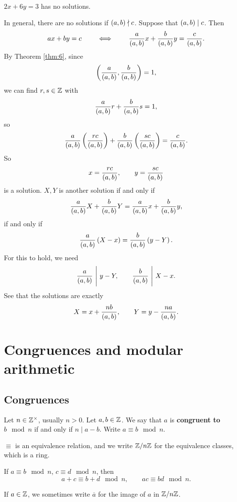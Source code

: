 \begin{example*}
$ 2x + 6y = 3 $ has no solutions.
\end{example*}

In general, there are no solutions if $ \left( a, b \right) \nmid c $. Suppose that $ \left( a, b \right) \mid c $. Then
$$ ax + by = c \qquad \iff \qquad \dfrac{a}{\left( a, b \right)}x + \dfrac{b}{\left( a, b \right)}y = \dfrac{c}{\left( a, b \right)}. $$
By Theorem \ref{thm:6}, since
$$ \left( \dfrac{a}{\left( a, b \right)}, \dfrac{b}{\left( a, b \right)} \right) = 1, $$
we can find $ r, s \in \mathbb{Z} $ with
$$ \dfrac{a}{\left( a, b \right)}r + \dfrac{b}{\left( a, b \right)}s = 1, $$
so
$$ \dfrac{a}{\left( a, b \right)}\left( \dfrac{rc}{\left( a, b \right)} \right) + \dfrac{b}{\left( a, b \right)}\left( \dfrac{sc}{\left( a, b \right)} \right) = \dfrac{c}{\left( a, b \right)}. $$
So
$$ x = \dfrac{rc}{\left( a, b \right)}, \qquad y = \dfrac{sc}{\left( a, b \right)} $$
is a solution.
$ X, Y $ is another solution if and only if
$$ \dfrac{a}{\left( a, b \right)}X + \dfrac{b}{\left( a, b \right)}Y = \dfrac{a}{\left( a, b \right)}x + \dfrac{b}{\left( a, b \right)}y, $$
if and only if
$$ \dfrac{a}{\left( a, b \right)}\left( X - x \right) = \dfrac{b}{\left( a, b \right)}\left( y - Y \right). $$
For this to hold, we need
$$ \dfrac{a}{\left( a, b \right)} \ \Bigg| \ y - Y, \qquad \dfrac{b}{\left( a, b \right)} \ \Bigg| \ X - x. $$
See that the solutions are exactly
$$ X = x + \dfrac{nb}{\left( a, b \right)}, \qquad Y = y - \dfrac{na}{\left( a, b \right)}. $$

\pagebreak

\section{Congruences and modular arithmetic}

\subsection{Congruences}

\begin{definition}
Let $ n \in \mathbb{Z}^\times $, usually $ n > 0 $. Let $ a, b \in \mathbb{Z} $. We say that $ a $ is \textbf{congruent to $ b \mod n $} if and only if $ n \mid a - b $. Write $ a \equiv b \mod n $.
\end{definition}

$ \equiv $ is an equivalence relation, and we write $ \mathbb{Z} / n\mathbb{Z} $ for the equivalence classes, which is a ring.

\begin{example*}
If $ a \equiv b \mod n $, $ c \equiv d \mod n $, then
$$ a + c \equiv b + d \mod n, \qquad ac \equiv bd \mod n. $$
\end{example*}

If $ a \in \mathbb{Z} $, we sometimes write $ \overline{a} $ for the image of $ a $ in $ \mathbb{Z} / n\mathbb{Z} $.

